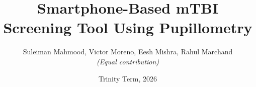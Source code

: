 \documentclass[report]{oxengthesis}
\title       {Smartphone-Based mTBI Screening Tool Using Pupillometry}
\author      {Suleiman Mahmood, Victor Moreno, Eesh Mishra, Rahul Marchand \\ \textit{(Equal contribution)}}
\date        {Trinity Term, 2026}
\begin{document}
\frontmatter
\makefrontmatterpages

\mainmatter








\appendix




\backmatter 
\listofreferences
\end{document}
